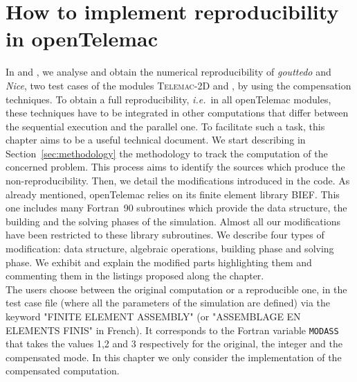 \newcommand{\red}{\color{red}}
\newcommand{\ie}{{\it i.e.}~}
\newcommand{\Hilight}{\makebox[0pt][l]{\color{babypink}\rule[-2pt]{\linewidth}{10pt}}}
\chapter{How to implement reproducibility in openTelemac}
\label{ref:reprod_guide}
%
%
In \cite{LaND15} and \cite{LaND16}, we analyse and obtain the numerical reproducibility
of \textit{gouttedo} and \textit{Nice}, two test cases of the modules {{\scshape Telemac-2D}\xspace}
and \tomawac, by using the compensation techniques.
To obtain a full reproducibility, \ie in all openTelemac
modules, these techniques have
to be integrated in other computations that differ between the sequential
execution and the parallel one.
To facilitate such a task, this chapter aims to be a useful technical
document.
%
We start describing in Section~\ref{sec:methodology} the methodology to
track the computation of the concerned problem. This process
aims to identify the sources which produce the non-reproducibility.
Then, we detail the modifications introduced in the code.
As already mentioned, openTelemac relies on its finite element library BIEF.
This one includes many Fortran~90 subroutines
which provide the data structure, the building and
the solving phases of the simulation.
Almost all our modifications have been restricted
to these library subroutines.
We describe four types of modification: data structure,
algebraic operations, building phase and solving phase.
We exhibit and explain the modified parts highlighting them and commenting them in
the listings proposed along the chapter.\\
%
%
The users choose between the original computation or a reproducible one,
in the test case file (where all the parameters of the simulation are defined)
via the keyword "FINITE ELEMENT ASSEMBLY"
(or "ASSEMBLAGE EN ELEMENTS FINIS" in French).
It corresponds to the Fortran variable \texttt{MODASS}
that takes the values 1,2 and 3 respectively for the original,
the integer and the compensated mode.
%
In this chapter we only consider the implementation of
the compensated computation.
%
